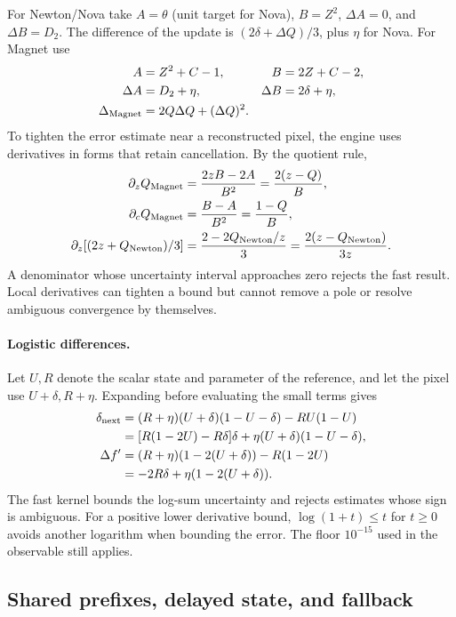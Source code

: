 \documentclass[11pt,a4paper]{article}
\numberwithin{equation}{section}
\begin{document}
For Newton/Nova take \(A=\theta\) (unit target for Nova), \(B=Z^2\),
\(\Delta A=0\), and \(\Delta B=D_2\). The difference of the update
is \((2\delta+\Delta Q)/3\), plus \(\eta\) for Nova. For Magnet use
\begin{align}
  A&=Z^2+C-1, & B&=2Z+C-2,\\
  \Delta A&=D_2+\eta, &\Delta B&=2\delta+\eta,\\
  \Delta_{\rm Magnet}&=2Q\Delta Q+(\Delta Q)^2 .
\end{align}
To tighten the error estimate near a reconstructed pixel, the engine
uses derivatives in forms that retain cancellation. By the quotient rule,
\begin{align}
  \partial_zQ_{\rm Magnet}
     &=\frac{2zB-2A}{B^2}=\frac{2(z-Q)}{B},\\
  \partial_cQ_{\rm Magnet}
     &=\frac{B-A}{B^2}=\frac{1-Q}{B},\\
  \partial_z[(2z+Q_{\rm Newton})/3]
     &=\frac{2-2Q_{\rm Newton}/z}{3}
       =\frac{2(z-Q_{\rm Newton})}{3z}.
\end{align}
A denominator whose uncertainty interval approaches zero rejects the
fast result. Local derivatives can tighten a bound but cannot remove a
pole or resolve ambiguous convergence by themselves.

\paragraph{Logistic differences.}
Let \(U,R\) denote the scalar state and parameter of the reference,
and let the pixel use \(U+\delta,R+\eta\). Expanding before evaluating
the small terms gives
\begin{align}
  \delta_{\rm next}
    &=(R+\eta)(U+\delta)(1-U-\delta)-RU(1-U)\notag\\
    &=[R(1-2U)-R\delta]\delta+
      \eta(U+\delta)(1-U-\delta),\\
  \Delta f'
    &=(R+\eta)(1-2(U+\delta))-R(1-2U)\notag\\
    &=-2R\delta+\eta(1-2(U+\delta)).
\end{align}
The fast kernel bounds the log-sum uncertainty and rejects estimates
whose sign is ambiguous. For a positive lower derivative bound,
\(\log(1+t)\le t\) for \(t\ge0\) avoids another logarithm when bounding
the error. The floor \(10^{-15}\) used in the observable still applies.

\subsection{Shared prefixes, delayed state, and fallback}
\end{document}
